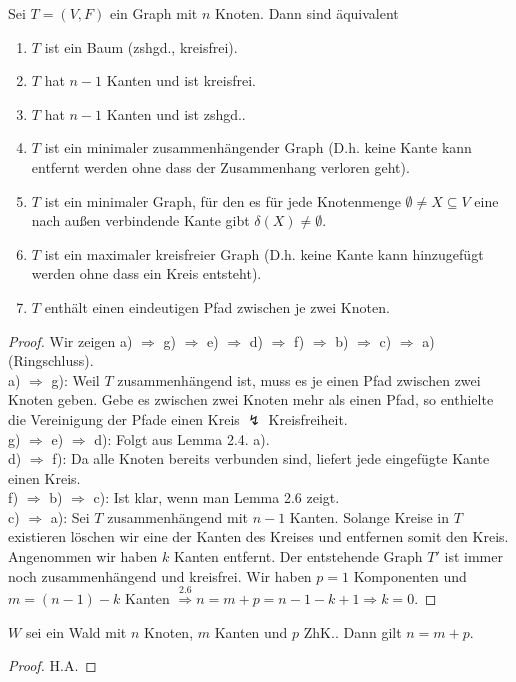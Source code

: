 \begin{satz}
	Sei $T=(V,F)$ ein Graph mit $n$ Knoten. Dann sind äquivalent
	\begin{enumerate}[label=\alph*)]
		\item $T$ ist ein Baum (zshgd., kreisfrei).
		\item $T$ hat $n-1$ Kanten und ist kreisfrei.
		\item $T$ hat $n-1$ Kanten und ist zshgd..
		\item $T$ ist ein minimaler zusammenhängender Graph (D.h. keine Kante kann entfernt werden ohne dass der Zusammenhang verloren geht).
		\item $T$ ist ein minimaler Graph, für den es für jede Knotenmenge $\emptyset \neq X\subseteq V$ eine nach außen verbindende Kante gibt $\delta(X) \neq \emptyset$.
		\item $T$ ist ein maximaler kreisfreier Graph (D.h. keine Kante kann hinzugefügt werden ohne dass ein Kreis entsteht).
		\item $T$ enthält einen eindeutigen Pfad zwischen je zwei Knoten.
	\end{enumerate}
\end{satz}
\begin{proof}
	Wir zeigen a) $\Rightarrow$ g) $\Rightarrow$ e) $\Rightarrow$ d) $\Rightarrow$ f) $\Rightarrow$ b) $\Rightarrow$ c) $\Rightarrow$ a) (Ringschluss).\\
	a) $\Rightarrow$ g): Weil $T$ zusammenhängend ist, muss es je einen Pfad zwischen zwei Knoten geben. Gebe es zwischen zwei Knoten mehr als einen Pfad, so enthielte die Vereinigung der Pfade einen Kreis $\lightning$ Kreisfreiheit.\\
	g) $\Rightarrow$ e) $\Rightarrow$ d): Folgt aus Lemma 2.4. a).\\
	d) $\Rightarrow$ f): Da alle Knoten bereits verbunden sind, liefert jede eingefügte Kante einen Kreis.\\
	f) $\Rightarrow$ b) $\Rightarrow$ c): Ist klar, wenn man Lemma 2.6 zeigt.\\
	c) $\Rightarrow$ a): Sei $T$ zusammenhängend mit $n-1$ Kanten. Solange Kreise in $T$ existieren löschen wir eine der Kanten des Kreises und entfernen somit den Kreis. Angenommen wir haben $k$ Kanten entfernt. Der entstehende Graph $T'$ ist immer noch zusammenhängend und kreisfrei. Wir haben $p=1$ Komponenten und $m=(n-1)-k$ Kanten $\overset{2.6}{\Rightarrow} n =m+p=n-1-k+1 \Rightarrow k=0$. 
\end{proof}
\begin{lemma}
	$W$ sei ein Wald mit $n$ Knoten, $m$ Kanten und $p$ ZhK.. Dann gilt $n=m+p$.
\end{lemma}
\begin{proof}
	H.A.
\end{proof}
